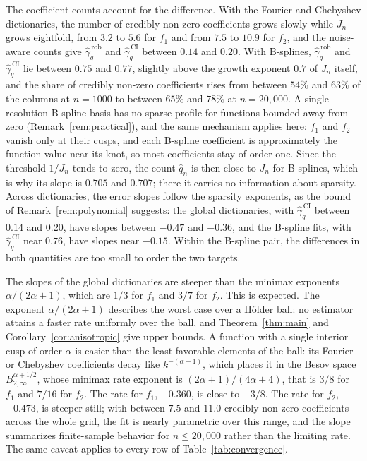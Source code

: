 The coefficient counts account for the difference. With the Fourier and Chebyshev dictionaries, the number of credibly non-zero coefficients grows slowly while $J_n$ grows eightfold, from $3.2$ to $5.6$ for $f_1$ and from $7.5$ to $10.9$ for $f_2$, and the noise-aware counts give $\widehat\gamma_q^{\,\mathrm{rob}}$ and $\widehat\gamma_q^{\,\mathrm{CI}}$ between $0.14$ and $0.20$. With B-splines, $\widehat\gamma_q^{\,\mathrm{rob}}$ and $\widehat\gamma_q^{\,\mathrm{CI}}$ lie between $0.75$ and $0.77$, slightly above the growth exponent $0.7$ of $J_n$ itself, and the share of credibly non-zero coefficients rises from between $54\%$ and $63\%$ of the columns at $n=1000$ to between $65\%$ and $78\%$ at $n=20{,}000$. A single-resolution B-spline basis has no sparse profile for functions bounded away from zero (Remark~\ref{rem:practical}), and the same mechanism applies here: $f_1$ and $f_2$ vanish only at their cusps, and each B-spline coefficient is approximately the function value near its knot, so most coefficients stay of order one. Since the threshold $1/J_n$ tends to zero, the count $\widehat q_n$ is then close to $J_n$ for B-splines, which is why its slope is $0.705$ and $0.707$; there it carries no information about sparsity. Across dictionaries, the error slopes follow the sparsity exponents, as the bound of Remark~\ref{rem:polynomial} suggests: the global dictionaries, with $\widehat\gamma_q^{\,\mathrm{CI}}$ between $0.14$ and $0.20$, have slopes between $-0.47$ and $-0.36$, and the B-spline fits, with $\widehat\gamma_q^{\,\mathrm{CI}}$ near $0.76$, have slopes near $-0.15$. Within the B-spline pair, the differences in both quantities are too small to order the two targets.

The slopes of the global dictionaries are steeper than the minimax exponents $\alpha/(2\alpha+1)$, which are $1/3$ for $f_1$ and $3/7$ for $f_2$. This is expected. The exponent $\alpha/(2\alpha+1)$ describes the worst case over a H\"older ball: no estimator attains a faster rate uniformly over the ball, and Theorem~\ref{thm:main} and Corollary~\ref{cor:anisotropic} give upper bounds. A function with a single interior cusp of order $\alpha$ is easier than the least favorable elements of the ball: its Fourier or Chebyshev coefficients decay like $k^{-(\alpha+1)}$, which places it in the Besov space $B^{\alpha+1/2}_{2,\infty}$, whose minimax rate exponent is $(2\alpha+1)/(4\alpha+4)$, that is $3/8$ for $f_1$ and $7/16$ for $f_2$. The rate for $f_1$, $-0.360$, is close to $-3/8$. The rate for $f_2$, $-0.473$, is steeper still; with between $7.5$ and $11.0$ credibly non-zero coefficients across the whole grid, the fit is nearly parametric over this range, and the slope summarizes finite-sample behavior for $n\leq20{,}000$ rather than the limiting rate. The same caveat applies to every row of Table~\ref{tab:convergence}.

